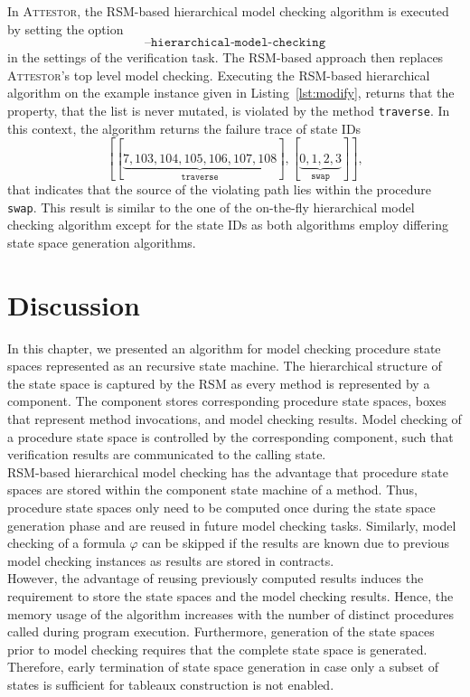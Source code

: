 \documentclass[a4paper, 12pt, twoside]{report}
\begin{document}
	In \textsc{Attestor}, the RSM-based hierarchical model checking algorithm is executed by setting the option \[\texttt{--hierarchical-model-checking}\] in the settings of the verification task. The RSM-based approach then replaces \textsc{Attestor}'s top level model checking.  Executing the RSM-based hierarchical algorithm on the example instance given in Listing~\ref{lst:modify}, returns that the property, that the list is never mutated, is violated by the method \texttt{traverse}. In this context, the algorithm returns the failure trace of state IDs \[[[\underbrace{7, 103, 104, 105, 106, 107, 108}_{\texttt{traverse}}], [\underbrace{0, 1, 2, 3}_{\texttt{swap}}]],\] that indicates that the source of the violating path lies within the procedure \texttt{swap}. This result is similar to the one of the on-the-fly hierarchical model checking algorithm except for the state IDs as both algorithms employ differing state space generation algorithms. 
	
	\section{Discussion}
	
	In this chapter, we presented an algorithm for model checking procedure state spaces represented as an recursive state machine. The hierarchical structure of the state space is captured by the RSM as every method is represented by a component. The component stores corresponding procedure state spaces, boxes that represent method invocations, and model checking results. Model checking of a procedure state space is controlled by the corresponding component, such that verification results are communicated to the calling state. \\
	
	RSM-based hierarchical model checking has the advantage that procedure state spaces are stored within the component state machine of a method. Thus, procedure state spaces only need to be computed once during the state space generation phase and are reused in future model checking tasks. Similarly, model checking of a formula $\varphi$ can be skipped if the results are known due to previous model checking instances as results are stored in contracts.\\	
	
	However, the advantage of reusing previously computed results induces the requirement to store the state spaces and the model checking results. Hence, the memory usage of the algorithm increases with the number of distinct procedures called during program execution. Furthermore, generation of the state spaces prior to model checking requires that the complete state space is generated. Therefore, early termination of state space generation in case only a subset of states is sufficient for tableaux construction is not enabled.\\	
	
\end{document}
